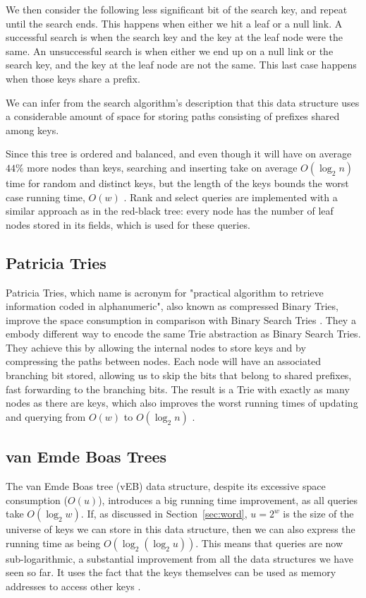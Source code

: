 We then consider the following less significant bit of the search key, and repeat until the search ends.
This happens when either we hit a leaf or a null link.
A successful search is when the search key and the key at the leaf node were the same.
An unsuccessful search is when either we end up on a null link or the search key, and the key at the leaf node are not the same.
This last case happens when those keys share a prefix.

We can infer from the search algorithm's description that this data structure uses a considerable amount of space for storing paths consisting of prefixes shared among keys.

Since this tree is ordered and balanced, and even though it will have on average $44\%$ more nodes than keys, searching and inserting take on average $O(\log_2 n)$ time for random and distinct keys, but the length of the keys bounds the worst case running time, $O(w)$ \cite{sedgewick2002algorithms}.
Rank and select queries are implemented with a similar approach as in the red-black tree: every node has the number of leaf nodes stored in its fields, which is used for these queries.

\subsection{Patricia Tries}

Patricia Tries, which name is acronym for "practical algorithm to retrieve information coded in alphanumeric", also known as compressed Binary Tries, improve the space consumption in comparison with Binary Search Tries \cite{sedgewick2002algorithms}.
They a embody different way to encode the same Trie abstraction as Binary Search Tries.
They achieve this by allowing the internal nodes to store keys and by compressing the paths between nodes.
Each node will have an associated branching bit stored, allowing us to skip the bits that belong to shared prefixes, fast forwarding to the branching bits.
The result is a Trie with exactly as many nodes as there are keys, which also improves the worst running times of updating and querying from $O(w)$ to $O(\log_2 n)$ \cite{sedgewick2002algorithms}.

\subsection{van Emde Boas Trees}

The van Emde Boas tree (vEB) data structure, despite its excessive space consumption ($O(u)$), introduces a big running time improvement, as all queries take $O(\log_2 w)$.
If, as discussed in Section~\ref{sec:word}, $u = 2^w$ is the size of the universe of keys we can store in this data structure, then we can also express the running time as being $O(\log_2(\log_2 u))$.
This means that queries are now sub-logarithmic, a substantial improvement from all the data structures we have seen so far.
It uses the fact that the keys themselves can be used as memory addresses to access other keys \cite{nelsonjelanilec1}.


